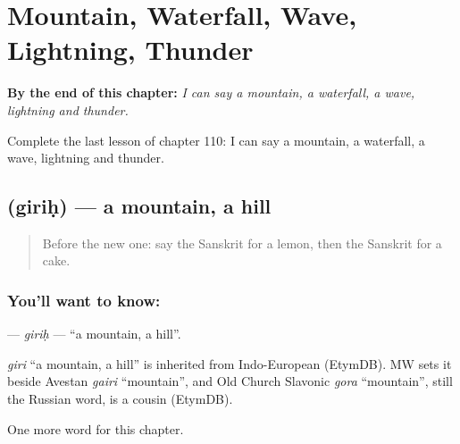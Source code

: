 
\chapter{Mountain, Waterfall, Wave, Lightning, Thunder}
\label{ch:sa-mountain-waterfall-wave-lightning-thunder}

\begin{chapteropening}
\textbf{By the end of this chapter:} \emph{I can say a mountain, a waterfall, a wave, lightning and thunder.}

Complete the last lesson of chapter 110: I can say a mountain, a waterfall, a wave, lightning and thunder.
\end{chapteropening}

\section[\texorpdfstring{\sk{गिरिः} (giriḥ)}{गिरिः (giriḥ)}]{ (giriḥ) — a mountain, a hill}

\label{lesson:SA-C110-girih}



\begin{quote}
Before the new one: say the Sanskrit for a lemon, then the Sanskrit for a cake.
\end{quote}

\subsection*{You'll want to know: }
\textbf{} — \emph{giriḥ} — \textquotedblleft{}a mountain, a hill\textquotedblright{}.

\begin{cousinweb}
\emph{giri} \textquotedblleft{}a mountain, a hill\textquotedblright{} is inherited from Indo-European (EtymDB). MW sets it beside Avestan \emph{gairi} \textquotedblleft{}mountain\textquotedblright{}, and Old Church Slavonic \emph{gora} \textquotedblleft{}mountain\textquotedblright{}, still the Russian word, is a cousin (EtymDB).
\end{cousinweb}

\begin{grammarlens}[title={What you've built}]
One more word for this chapter.
\end{grammarlens}

